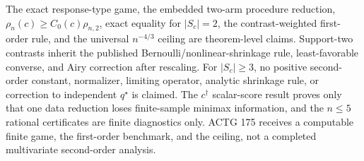 The exact response-type game, the embedded two-arm procedure reduction, \(\rho_n(c)\geq C_0(c)\rho_{n,2}\), exact equality for \(|S_c|=2\), the contrast-weighted first-order rule, and the universal \(n^{-4/3}\) ceiling are theorem-level claims.  Support-two contrasts inherit the published Bernoulli/nonlinear-shrinkage rule, least-favorable converse, and Airy correction after rescaling.  For \(|S_c|\geq3\), no positive second-order constant, normalizer, limiting operator, analytic shrinkage rule, or correction to independent \(q^\star\) is claimed.  The \(c^\dagger\) scalar-score result proves only that one data reduction loses finite-sample minimax information, and the \(n\leq5\) rational certificates are finite diagnostics only.  ACTG 175 receives a computable finite game, the first-order benchmark, and the ceiling, not a completed multivariate second-order analysis.
